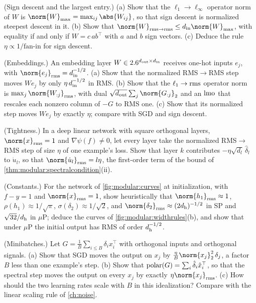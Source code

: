 \begin{refsection}
\begin{exercises}
\item \consolidation (Sign descent and the largest entry.) (a) Show that the $\ell_1\to\ell_\infty$ operator norm of $W$ is $\norm{W}_{\max}=\max_{ij}\abs{W_{ij}}$, so that sign descent is normalized steepest descent in it. (b) Show that $\norm{W}_{\rms\to\rms}\le\modularin\norm{W}_{\max}$, with equality if and only if $W=c\,ab^\top$ with $a$ and $b$ sign vectors. (c) Deduce the rule $\eta\propto1/\text{fan-in}$ for sign descent.\label{ex:modular:signnorm}

\item \consolidation (Embeddings.) An embedding layer $W\in2.6^{d_{\mathrm{out}}\times d_{\mathrm{in}}}$ receives one-hot inputs $e_j$, with $\norm{e_j}_\rms=\modularin^{-1/2}$. (a) Show that the normalized RMS$\to$RMS step moves $We_j$ by only $\eta\,d_{\mathrm{in}}^{-1/2}$ in RMS. (b) Show that the $\ell_1\to\mathrm{rms}$ operator norm is $\max_j\norm{W_{:j}}_\rms$, with dual $\sqrt{\modularout}\sum_j\norm{G_{:j}}_2$ and an $\operatorname{lmo}$ that rescales each nonzero column of $-G$ to RMS one. (c) Show that its normalized step moves $We_j$ by exactly $\eta$; compare with SGD and sign descent.\label{ex:modular:embedding}

\item \consolidation (Tightness.) In a deep linear network with square orthogonal layers, $\norm{x}_\rms=1$ and $\nabla\psi(f)\ne0$, let every layer take the normalized RMS$\to$RMS step of size $\eta$ of one example's loss. Show that layer $k$ contributes $-\eta\sqrt{d_l}\,\hat\delta_l$ to $\dot u_l$, so that $\norm{\dot u_l}_\rms=l\eta$, the first-order term of the bound of \cref{thm:modular:spectralcondition}(ii).\label{ex:modular:tight}

\item \consolidation (Constants.) For the network of \cref{fig:modular:curves} at initialization, with $f-y=1$ and $\norm{x}_\rms=1$, show heuristically that $\norm{h_1}_\rms\approx1$, $\rho(h_1)\approx1/\sqrt\pi$, $\sigma(\delta_2)\approx1/\sqrt2$, and $\norm{\delta_2}_\rms\approx(2\modularh)^{-1/2}$ in SP and $\sqrt{32}/d_{\mathrm h}$ in $\mu$P; deduce the curves of \cref{fig:modular:widthrules}(b), and show that under $\mu$P the initial output has RMS of order $d_{\mathrm h}^{-1/2}$.\label{ex:modular:constants}

\item \variation (Minibatches.) Let $G=\frac1B\sum_{i\le B}\delta_ix_i^\top$ with orthogonal inputs and orthogonal signals. (a) Show that SGD moves the output on $x_j$ by $\frac\eta B\norm{x_j}_2^2\,\delta_j$, a factor $B$ less than one example's step. (b) Show that $\operatorname{polar}(G)=\sum_i\hat\delta_i\hat x_i^\top$, so that the spectral step moves the output on every $x_j$ by exactly $\eta\norm{x_j}_\rms$. (c) How should the two learning rates scale with $B$ in this idealization? Compare with the linear scaling rule of \cref{ch:noise}.\label{ex:modular:batch}


\end{exercises}
\end{refsection}
